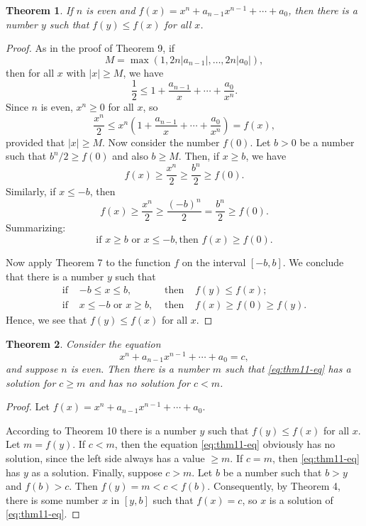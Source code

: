 \documentclass{article}
\newtheorem{theorem}{Theorem}
\begin{document}
\begin{theorem}
  If $n$ is even and $f(x) = x^n + a_{n-1}x^{n-1} + \cdots + a_0$, then there
  is a number $y$ such that $f(y) \leq f(x)$ for all $x$.
\end{theorem}
\begin{proof}
  As in the proof of Theorem 9, if \[
    M = \max(1, 2n|a_{n-1}|, \ldots, 2n|a_0|),
  \] then for all $x$ with $|x| \geq M$, we have \[
    \frac{1}{2} \leq 1 + \frac{a_{n-1}}{x} + \cdots + \frac{a_0}{x^n}.
    \] Since $n$ is even, $x^n \geq 0$ for all $x$, so \[
    \frac{x^n}{2}
    \leq x^n \left( 1 + \frac{a_{n-1}}{x} + \cdots + \frac{a_0}{x^n} \right)
    = f(x),
  \] provided that $|x| \geq M$. Now consider the number $f(0)$. Let $b > 0$ be
  a number such that $b^n/2 \geq f(0)$ and also $b \geq M$. Then, if $x \geq
  b$, we have \[
    f(x) \geq \frac{x^n}{2} \geq \frac{b^n}{2} \geq f(0).
  \] Similarly, if $x \leq -b$, then \[
    f(x) \geq \frac{x^n}{2} \geq \frac{(-b)^n}{2} = \frac{b^n}{2} \geq f(0).
  \] Summarizing: \[
    \text{if } x \geq b \text{ or } x \leq -b, \text{then } f(x) \geq f(0).
  \]

  Now apply Theorem 7 to the function $f$ on the interval $[-b, b]$. We
  conclude that there is a number $y$ such that \begin{align*}
    \text{if } &-b \leq x \leq b, &\text{ then } &f(y) \leq f(x); \\
    \text{if } &x \leq -b \text{ or } x \geq b, &\text{ then } &f(x) \geq f(0)
      \geq f(y).
  \end{align*}
  Hence, we see that $f(y) \leq f(x)$ for all $x$.
\end{proof}

\begin{theorem}
  Consider the equation \[
    \label{eq:thm11-eq} \tag{*}
    x^n + a_{n-1}x^{n-1} + \cdots + a_0 = c, 
  \] and suppose $n$ is even. Then there is a number $m$ such that
  \eqref{eq:thm11-eq} has a solution for $c \geq m$ and has no solution for $c
  < m$.
\end{theorem}

\begin{proof}
  Let $f(x) = x^n + a_{n-1}x^{n-1} + \cdots + a_0$.

  According to Theorem 10 there is a number $y$ such that $f(y) \leq f(x)$ for
  all $x$. Let $m = f(y)$. If $c < m$, then the equation \eqref{eq:thm11-eq}
  obviously has no solution, since the left side always has a value $\geq m$.
  If $c = m$, then \eqref{eq:thm11-eq} has $y$ as a solution. Finally,
  suppose $c > m$. Let $b$ be a number such that $b > y$ and $f(b) > c$. Then
  $f(y) = m < c < f(b)$. Consequently, by Theorem 4, there is some number $x$
  in $[y, b]$ such that $f(x) = c$, so $x$ is a solution of
  \eqref{eq:thm11-eq}.
\end{proof}
\end{document}
